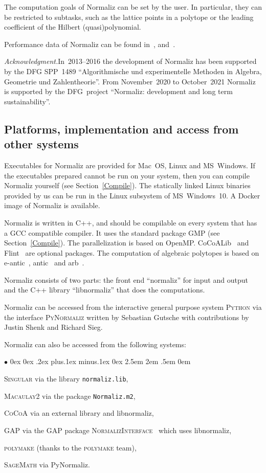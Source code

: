 \documentclass[12pt,a4paper]{scrartcl}
\newcommand{\stdli}{ \topsep0ex \partopsep0ex %
\parsep.2ex plus.1ex minus.1ex \itemsep0ex%
\leftmargin2.5em \labelwidth2em \labelsep.5em \rightmargin0em}%
\renewenvironment{itemize}{\begin{list}{{$\bullet$}}{\stdli}}{\end{list}}
\theoremstyle{definition}
\def\ttt{\texttt}
\begin{document}
The computation goals of Normaliz can be set by the user. In particular, they can be restricted to subtasks, such as the lattice points in a polytope or the leading coefficient of the Hilbert (quasi)polynomial.

Performance data of Normaliz can be found in~\cite{BI2}, \cite{BIS} and~\cite{BIS2}.

\emph{Acknowledgment.}\enspace In~2013--2016 the development of Normaliz has been supported by the DFG SPP~1489 ``Algorithmische und experimentelle Methoden in Algebra, Geometrie und Zahlentheorie''. From November~2020 to October~2021 Normaliz is supported by the DFG~project ``Normaliz: development and long term sustainability''.

\subsection{Platforms, implementation and access from other systems}

Executables for Normaliz are provided for Mac~OS, Linux and MS~Windows. If the executables prepared cannot be run on your system, then you can compile Normaliz yourself (see Section~\ref{Compile}). The statically linked Linux binaries provided by us can be run in the Linux subsystem of MS~Windows~10. A Docker image of Normaliz is available.

Normaliz is written in C++, and should be compilable on every system that has a GCC compatible compiler. It uses the standard package GMP (see Section~\ref{Compile}). The parallelization is based on OpenMP. CoCoALib~\cite{CoCoA} and Flint~\cite{Flint} are optional packages. The computation of algebraic polytopes is based on e-antic~\cite{e-antic}, antic~\cite{antic} and arb~\cite{arb}.

Normaliz consists of two parts: the front end ``normaliz'' for input and output and the C++ library ``libnormaliz'' that does the computations.

Normaliz can be accessed from the interactive general purpose system \textsc{Python} via the interface \textsc{PyNormaliz} written by Sebastian Gutsche with contributions by Justin Shenk and Richard Sieg.

Normaliz can also be accessed from the following systems:
\begin{itemize}
	\item \textsc{Singular} via the library \ttt{normaliz.lib},
	\item \textsc{Macaulay2} via the package \ttt{Normaliz.m2},
	\item \textsc{CoCoA} via an external library and libnormaliz,
	\item \textsc{GAP} via the GAP package \textsc{NormalizInterface}~\cite{GAP-NmzInterface} which uses libnormaliz,
	\item \textsc{polymake} (thanks to the \textsc{polymake}
	team),
	\item \textsc{SageMath} via PyNormaliz.
\end{itemize}
\end{document}
